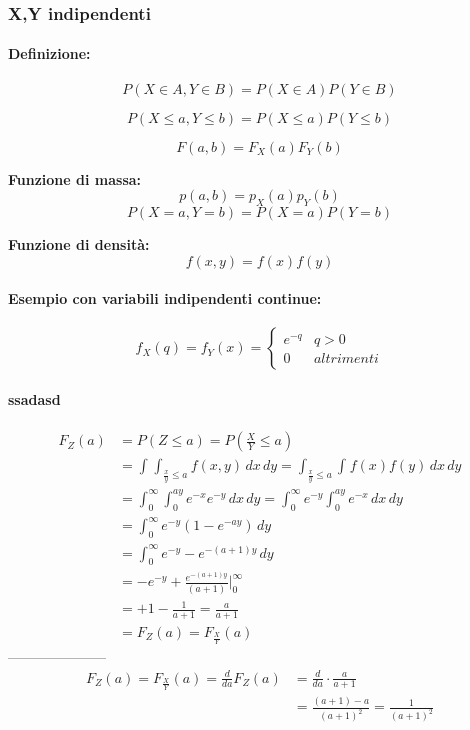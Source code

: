 \documentclass[]{article}
\newcommand{\definizione}{\paragraph{Definizione:}}
\begin{document}
    \subsubsection{X,Y indipendenti}
    \definizione
    \[ P(X \in A, Y \in B) = P(X \in A) P(Y \in B)\]

    \[ P(X \leq a, Y \leq b) = P(X \leq a) P(Y \leq b)\]

    \[ F(a,b) = F_X(a) F_Y(b)\]

    \textbf{Funzione di massa:}
    \[ p(a,b) = p_X(a) p_Y(b) \]
    \[ P(X=a, Y=b) = P(X=a) P(Y=b)\]

    \textbf{Funzione di densità:}
    \[ f(x, y) = f(x) f(y)\]
    
    \paragraph{Esempio con variabili indipendenti continue:}
    \begin{equation*}
        f_X(q) = f_Y(x) =
        \begin{cases}
            e^{-q} & q > 0 \\
            0 & altrimenti
        \end{cases}
    \end{equation*}

    \paragraph[short]{ssadasd}
    \begin{equation*}
    \begin{split}
        F_Z(a) & = P(Z \leq a) = P(\frac{X}{Y} \leq a) \\
        & = \int_{}^{} \int_{\frac{x}{y} \leq a}^{} f(x,y) \, dx \, dy = \int_{\frac{x}{y} \leq a}^{}\int_{}^{} f(x) f(y) \, dx \, dy \\ 
        & = \int_{0}^{\infty} \int_{0}^{ay} e^{-x} e^{-y} \, dx \, dy = \int_{0}^{\infty} e^{-y} \int_{0}^{ay} e^{-x} \, dx \, dy \\ 
        & = \int_{0}^{\infty} e^{-y}(1-e^{-ay}) \, dy \\
        & = \int_{0}^{\infty} e^{-y} -e^{-(a+1)y} \, dy \\ 
        & = -e^{-y} + \frac{e^{-(a+1)y}}{(a+1)} \bigg\rvert_{0}^{\infty} \\ 
        & = + 1 - \frac{1}{a+1} = \frac{a}{a+1} \\
        & = F_Z(a) = F_\frac{X}{Y}(a)
    \end{split}
    \end{equation*}
    ---------------------
    \begin{equation*}
    \begin{split}
        F_Z(a) = F_{\frac{X}{Y}}(a) = \frac{d}{da} F_Z(a) & = \frac{d}{da} \cdot \frac{a}{a+1} \\ 
        & = \frac{(a+1) - a}{(a+1)^2} = \frac{1}{(a+1)^2} 
    \end{split}
    \end{equation*}
\end{document}
